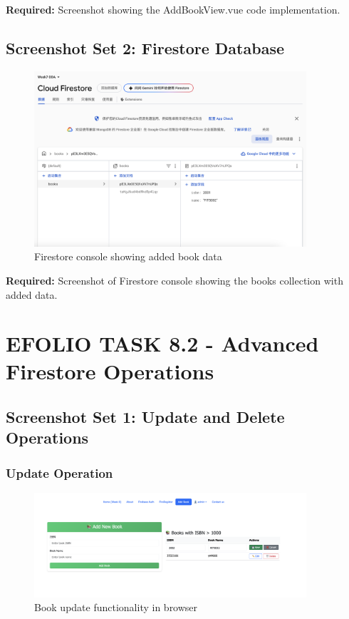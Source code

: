 \documentclass[11pt,a4paper]{article}
\begin{document}
\textbf{Required:} Screenshot showing the AddBookView.vue code implementation.

\subsection{Screenshot Set 2: Firestore Database}

 \begin{figure}[H]
    \centering
    \includegraphics[width=0.9\textwidth]{firestore_data.png}
    \caption{Firestore console showing added book data}
    \label{fig:firestore_data}
\end{figure}

\textbf{Required:} Screenshot of Firestore console showing the books collection with added data.

\newpage


\section{EFOLIO TASK 8.2 - Advanced Firestore Operations}

\subsection{Screenshot Set 1: Update and Delete Operations}

\subsubsection{Update Operation}
 \begin{figure}[H]
    \centering
    \includegraphics[width=0.9\textwidth]{update_book_browser.png}
    \caption{Book update functionality in browser}
    \label{fig:update_book_browser}
 \end{figure}
\end{document}
